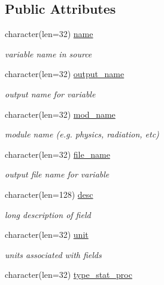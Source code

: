 \subsection*{Public Attributes}
\begin{DoxyCompactItemize}
\item 
character(len=32) \hyperlink{structdycore__typedefs_1_1dycore__diag__type_a0fb804dacaaccb289ae3aabe1b445f31}{name}
\begin{DoxyCompactList}\small\item\em variable name in source \end{DoxyCompactList}\item 
character(len=32) \hyperlink{structdycore__typedefs_1_1dycore__diag__type_a06218b1408fa9b6730e1034b6d26c77c}{output\-\_\-name}
\begin{DoxyCompactList}\small\item\em output name for variable \end{DoxyCompactList}\item 
character(len=32) \hyperlink{structdycore__typedefs_1_1dycore__diag__type_ab3879ca062dfe1cb6362f9397691b87b}{mod\-\_\-name}
\begin{DoxyCompactList}\small\item\em module name (e.\-g. physics, radiation, etc) \end{DoxyCompactList}\item 
character(len=32) \hyperlink{structdycore__typedefs_1_1dycore__diag__type_adce883539145f85406cd69b9286b2f3c}{file\-\_\-name}
\begin{DoxyCompactList}\small\item\em output file name for variable \end{DoxyCompactList}\item 
character(len=128) \hyperlink{structdycore__typedefs_1_1dycore__diag__type_ad80ebe3be46ad81d5899d42175361dce}{desc}
\begin{DoxyCompactList}\small\item\em long description of field \end{DoxyCompactList}\item 
character(len=32) \hyperlink{structdycore__typedefs_1_1dycore__diag__type_ac3db7b34f757a51cd2f00f6d0d68539f}{unit}
\begin{DoxyCompactList}\small\item\em units associated with fields \end{DoxyCompactList}\item 
character(len=32) \hyperlink{structdycore__typedefs_1_1dycore__diag__type_ab80143ebc2497201057b46c075d3bf68}{type\-\_\-stat\-\_\-proc}

\end{DoxyCompactItemize}
